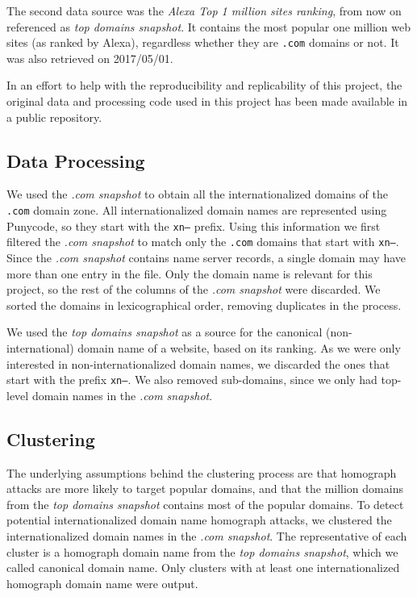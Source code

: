 \documentclass[letterpaper,twocolumn,10pt]{article}
\begin{document}
The second data source was the \textit{Alexa Top 1 million sites ranking}, from now on referenced as \textit{top domains snapshot}.
It contains the most popular one million web sites (as ranked by Alexa), regardless whether they are \texttt{.com} domains or not.
It was also retrieved on 2017/05/01.

In an effort to help with the reproducibility and replicability of this project, the original data and processing code used in this project has been made available in a public repository.

\subsection{Data Processing}
We used the \textit{.com snapshot} to obtain all the internationalized domains of the \texttt{.com} domain zone.
All internationalized domain names are represented using Punycode, so they start with the \texttt{xn--} prefix.
Using this information we first filtered the \textit{.com snapshot} to match only the \texttt{.com} domains that start with \texttt{xn--}.
Since the \textit{.com snapshot} contains name server records, a single domain may have more than one entry in the file.
Only the domain name is relevant for this project, so the rest of the columns of the \textit{.com snapshot} were discarded.
We sorted the domains in lexicographical order, removing duplicates in the process.

We used the \textit{top domains snapshot} as a source for the canonical (non-international) domain name of a website, based on its ranking.
As we were only interested in non-internationalized domain names, we discarded the ones that start with the prefix \texttt{xn--}.
We also removed sub-domains, since we only had top-level domain names in the \textit{.com snapshot}.

\subsection{Clustering}
The underlying assumptions behind the clustering process are that homograph attacks are more likely to target popular domains, and that the million domains from the \textit{top domains snapshot} contains most of the popular domains.
To detect potential internationalized domain name homograph attacks, we clustered the internationalized domain names in the \textit{.com snapshot}.
The representative of each cluster is a homograph domain name from the \textit{top domains snapshot}, which we called canonical domain name.
Only clusters with at least one internationalized homograph domain name were output.
\end{document}
